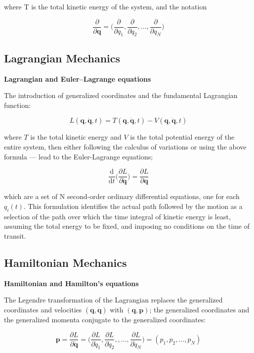 \documentclass[
  notoc %
]{tufte-book}
\begin{document}
where T is the total kinetic energy of the system, and the notation

\[
\frac{\partial}{\partial\mathbf{q}} = \Big( \frac{\partial}{\partial q_1},\frac{\partial}{\partial q_2}, ..., \frac{\partial}{\partial q_N} \Big)
\]

\hypertarget{lagrangian-mechanics}{%
\subsection{Lagrangian Mechanics}\label{lagrangian-mechanics}}

\textbf{Lagrangian and Euler--Lagrange equations}

The introduction of generalized coordinates and the fundamental
Lagrangian function:

\[
L(\mathbf{q},\dot{\mathbf{q}},t) = T(\mathbf{q},\dot{\mathbf{q}},t) - V(\mathbf{q},\dot{\mathbf{q}},t)
\]

where \(T\) is the total kinetic energy and \(V\) is the total potential
energy of the entire system, then either following the calculus of
variations or using the above formula --- lead to the Euler-Lagrange
equations;

\[
\frac{\mathrm{d}}{\mathrm{d}t}\Big( \frac{\partial L}{\partial\dot{\mathbf{q}}} \Big) = \frac{\partial L}{\partial\mathbf{q}}
\]

which are a set of N second-order ordinary differential equations, one
for each \(q_i(t)\). This formulation identifies the actual path
followed by the motion as a selection of the path over which the time
integral of kinetic energy is least, assuming the total energy to be
fixed, and imposing no conditions on the time of transit.

\hypertarget{hamiltonian-mechanics}{%
\subsection{Hamiltonian Mechanics}\label{hamiltonian-mechanics}}

\textbf{Hamiltonian and Hamilton's equations}

The Legendre transformation of the Lagrangian replaces the generalized
coordinates and velocities \((\mathbf{q}, \dot{\mathbf{q}})\) with
\((\mathbf{q}, \mathbf{p})\); the generalized coordinates and the
generalized momenta conjugate to the generalized coordinates:

\[
\mathbf{p} = \frac{\partial L}{\partial\dot{\mathbf{q}}} = \Big(\frac{\partial L}{\partial\dot{q}_1},\frac{\partial L}{\partial\dot{q}_2},,...,\frac{\partial L}{\partial\dot{q}_N} \Big) = (p_1, p_2, ..., p_N)
\]
\end{document}
